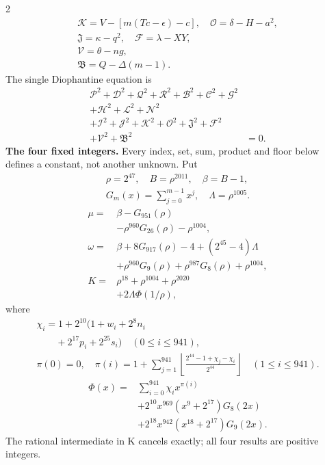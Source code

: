 \documentclass[10pt]{article}
\newcommand{\fl}[1]{\left\lfloor#1\right\rfloor}
\begin{document}
\begin{multicols}{2}
\[\begin{gathered}
\mathcal{K}=V-[m(Tc-\epsilon)-c],\quad\mathcal{O}=\delta-H-a^2,\\
\mathfrak{J}=\kappa-q^2,\quad\mathcal{F}=\lambda-XY,\\
\mathcal{V}=\theta-ng,\\
\mathfrak{B}=Q-\Delta(m-1).
\end{gathered}
\]
The single Diophantine equation is
\[
\begin{split}
\mathcal{P}^2+\mathcal{D}^2+\mathcal{Q}^2+\mathcal{R}^2+\mathcal{B}^2+\mathcal{C}^2+\mathcal{G}^2 &\\
+\mathcal{H}^2+\mathcal{L}^2+\mathcal{N}^2 &\\
+\mathcal{I}^2+\mathcal{J}^2+\mathcal{K}^2+\mathcal{O}^2+\mathfrak{J}^2+\mathcal{F}^2 &\\
+\mathcal{V}^2+\mathfrak{B}^2 &= 0.
\end{split}
\]
\textbf{The four fixed integers.}
Every index, set, sum, product and floor below defines a constant, not
another unknown. Put
\[
\begin{gathered}
\rho=2^{47},\quad B=\rho^{2011},\quad\beta=B-1,\\
G_m(x)=\sum_{j=0}^{m-1}x^j,\quad
\Lambda=\rho^{1005}.
\end{gathered}
\]
\begin{align*}
\mu={}&\beta-G_{951}(\rho)\\
&-\rho^{960}G_{26}(\rho)-\rho^{1004},\\
\omega={}&\beta+8G_{917}(\rho)-4+(2^{45}-4)\Lambda\\
&+\rho^{960}G_9(\rho)+\rho^{987}G_8(\rho)
  +\rho^{1004},\\
K={}&\rho^{18}+\rho^{1004}+\rho^{2020}\\
&+2\Lambda\Phi(1/\rho),
\end{align*}
where
\[
\begin{gathered}
\chi_i=1+2^{10}(1+w_i+2^8n_i\\
\qquad+2^{17}p_i+2^{25}s_i)\quad(0\le i\le941),\\
\pi(0)=0,\quad\pi(i)=1+\sum_{j=1}^{941}
\fl{\frac{2^{44}-1+\chi_j-\chi_i}{2^{44}}}\quad(1\le i\le941).
\end{gathered}
\]
\[
\begin{split}
\Phi(x)={}&\sum_{i=0}^{941}\chi_i x^{\pi(i)}\\
&+2^{10}x^{969}(x^9+2^{17})G_8(2x)\\
&+2^{18}x^{942}(x^{18}+2^{17})G_9(2x).
\end{split}
\]
The rational intermediate in K cancels exactly; all four results are positive integers.


\end{multicols}
\end{document}
